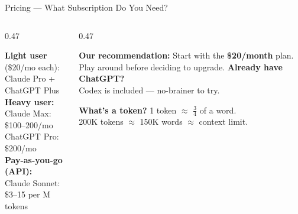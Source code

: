 \documentclass[aspectratio=169, 10pt]{beamer}
\begin{document}
\begin{frame}{Pricing --- What Subscription Do You Need?}
\begin{columns}[T]
\begin{column}{0.47\textwidth}
\begin{tcolorbox}[keybox, title={\faDollarSign\quad Plans}]
\scriptsize
\textbf{Light user} (\$20/mo each):\\
Claude Pro + ChatGPT Plus\\[3pt]
\textbf{Heavy user:}\\
Claude Max: \$100--200/mo\\
ChatGPT Pro: \$200/mo\\[3pt]
\textbf{Pay-as-you-go (API):}\\
Claude Sonnet: \$3--15 per M tokens
\end{tcolorbox}
\end{column}
\begin{column}{0.47\textwidth}
\begin{tcolorbox}[accentbox]
\scriptsize
\textbf{Our recommendation:}
\vskip2pt
Start with the \textbf{\$20/month} plan. Play around before deciding to upgrade.
\vskip4pt
\textbf{Already have ChatGPT?}\\
Codex is included --- no-brainer to try.
\end{tcolorbox}
\vskip4pt
\begin{tcolorbox}[colback=PaleSage, colframe=CoolGray!50, boxrule=0.4pt, left=4pt, right=4pt, top=2pt, bottom=2pt]
\centering\scriptsize
\textbf{What's a token?} 1 token $\approx$ $\frac{3}{4}$ of a word.\\
200K tokens $\approx$ 150K words $\approx$ context limit.
\end{tcolorbox}
\end{column}
\end{columns}
\end{frame}
\end{document}
